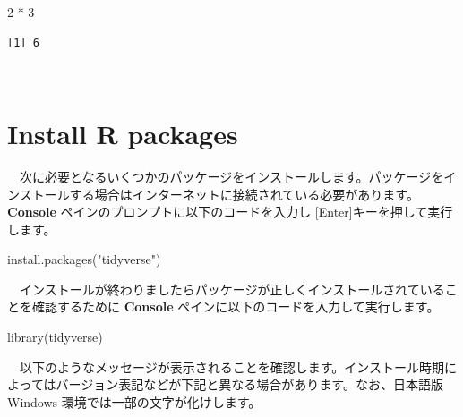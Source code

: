 \documentclass[
  12pt,
]{book}
\newenvironment{Shaded}{\begin{snugshade}}{\end{snugshade}}
\newcommand{\DecValTok}[1]{\textcolor[rgb]{0.00,0.00,0.81}{#1}}
\newcommand{\FunctionTok}[1]{\textcolor[rgb]{0.00,0.00,0.00}{#1}}
\newcommand{\NormalTok}[1]{#1}
\newcommand{\SpecialCharTok}[1]{\textcolor[rgb]{0.00,0.00,0.00}{#1}}
\newcommand{\StringTok}[1]{\textcolor[rgb]{0.31,0.60,0.02}{#1}}
\begin{document}
\begin{Shaded}
\begin{Highlighting}[]
\DecValTok{2} \SpecialCharTok{*} \DecValTok{3}
\end{Highlighting}
\end{Shaded}

\begin{verbatim}
[1] 6
\end{verbatim}

　

\hypertarget{install-r-packages}{%
\section{Install R packages}\label{install-r-packages}}

　次に必要となるいくつかのパッケージをインストールします。パッケージをインストールする場合はインターネットに接続されている必要があります。 \textbf{Console} ペインのプロンプトに以下のコードを入力し {[}Enter{]}キーを押して実行します。

\begin{Shaded}
\begin{Highlighting}[]
\FunctionTok{install.packages}\NormalTok{(}\StringTok{"tidyverse"}\NormalTok{)}
\end{Highlighting}
\end{Shaded}

　インストールが終わりましたらパッケージが正しくインストールされていることを確認するために \textbf{Console} ペインに以下のコードを入力して実行します。

\begin{Shaded}
\begin{Highlighting}[]
\FunctionTok{library}\NormalTok{(tidyverse)}
\end{Highlighting}
\end{Shaded}

　以下のようなメッセージが表示されることを確認します。インストール時期によってはバージョン表記などが下記と異なる場合があります。なお、日本語版 Windows 環境では一部の文字が化けします。
\end{document}
